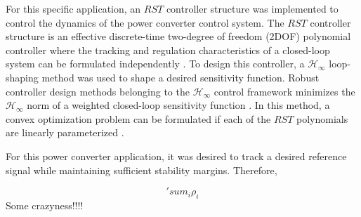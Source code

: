 \documentclass[11pt,english]{article}
\begin{document}
For this specific application, an $RST$ controller structure was implemented to control the dynamics of the power converter control system. The $RST$ controller structure is an effective discrete-time two-degree of freedom (2DOF) polynomial controller where the tracking and regulation characteristics of a closed-loop system can be formulated independently \cite{LZ06}. To design this controller, a $\mathcal{H}_\infty$ loop-shaping method was used to shape a desired sensitivity function. Robust controller design methods belonging to the $\mathcal{H}_{\infty}$ control framework minimizes the $\mathcal{H}_{\infty}$ norm of a weighted closed-loop sensitivity function \cite{ZD98}. In this method, a convex optimization problem can be formulated if each of the $RST$ polynomials are linearly parameterized \cite{NEK15}. 

For this power converter application, it was desired to track a desired reference signal while maintaining sufficient stability margins. Therefore, 


\begin{equation}
'sum_i \rho_i
\end{equation}
 Some crazyness!!!!


\end{document}
